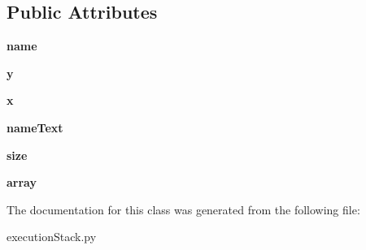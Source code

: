 \subsection*{Public Attributes}
\begin{DoxyCompactItemize}
\item 
\mbox{\label{classexecution_stack_1_1_visual_array_a023a4ef16ccae091bef57d53e2a51dae}} 
{\bfseries name}
\item 
\mbox{\label{classexecution_stack_1_1_visual_array_ab3f2e9efc42105c4331895a70a8b4eee}} 
{\bfseries y}
\item 
\mbox{\label{classexecution_stack_1_1_visual_array_a39c643fa75477c85f01f9e1b0108f353}} 
{\bfseries x}
\item 
\mbox{\label{classexecution_stack_1_1_visual_array_a8d513f04c041be10b60a472341aca538}} 
{\bfseries name\+Text}
\item 
\mbox{\label{classexecution_stack_1_1_visual_array_a5498a6092e7d281cd651139137aa4bc7}} 
{\bfseries size}
\item 
\mbox{\label{classexecution_stack_1_1_visual_array_af9ff7cb5547d5a4f85a49350ff4fdef7}} 
{\bfseries array}
\end{DoxyCompactItemize}


The documentation for this class was generated from the following file\+:\begin{DoxyCompactItemize}
\item 
execution\+Stack.\+py\end{DoxyCompactItemize}
